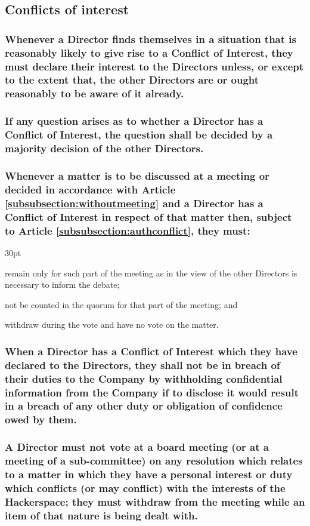 \documentclass[12pt]{article}
\def\clauseindent{30pt}
\newenvironment{subindent}{\begin{adjustwidth}{\clauseindent}{}\begin{hanginglist}}{\end{hanginglist}\end{adjustwidth}}
\begin{document}
\subsection{Conflicts of interest}
\subsubsection{Whenever a Director finds themselves in a situation that is reasonably likely to give rise to a Conflict of Interest, they must declare their interest to the Directors unless, or except to the extent that, the other Directors are or ought reasonably to be aware of it already.}
\subsubsection{If any question arises as to whether a Director has a Conflict of Interest, the question shall be decided by a majority decision of the other Directors.}
\subsubsection{\label{subsubsubsection:directornovote}Whenever a matter is to be discussed at a meeting or decided in accordance with Article \ref{subsubsection:withoutmeeting} and a Director has a Conflict of Interest in respect of that matter then, subject to Article \ref{subsubsection:authconflict}, they must:}
\begin{subindent}
  \item remain only for such part of the meeting as in the view of the other Directors is necessary to inform the debate;
  \item not be counted in the quorum for that part of the meeting; and
  \item withdraw during the vote and have no vote on the matter.
\end{subindent}
\subsubsection{When a Director has a Conflict of Interest which they have declared to the Directors, they shall not be in breach of their duties to the Company by withholding confidential information from the Company if to disclose it would result in a breach of any other duty or obligation of confidence owed by them.}
\subsubsection{\label{subsubsubsection:withdraw}A Director must not vote at a board meeting (or at a meeting of a sub-committee) on any resolution which relates to a matter in which they have a personal interest or duty which conflicts (or may conflict) with the interests of the Hackerspace; they must withdraw from the meeting while an item of that nature is being dealt with.}
\end{document}
